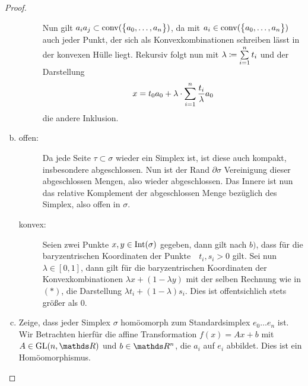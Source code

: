 \begin{Satz}
\begin{proof}
\begin{enumerate}[(a):]
\begin{description}
        Nun gilt $a_ia_j \subset \conv( \sset{a_0,\ldots , a_n} )$, da
        mit $a_i \in \ch$ auch jeder Punkt, der sich als
        Konvexkombinationen schreiben lässt in der konvexen Hülle
        liegt. Rekursiv folgt nun mit
        $\lambda \coloneqq \sp{1}{n} t_i$ und der Darstellung
        \begin{gather*}
          x = t_0 a_0 + \lambda \cdot \sp{1}{n} \frac{t_i}{\lambda}
          a_0
        \end{gather*}
      die andere Inklusion.
     \end{description}

   \item \begin{description}
     \item[offen:] Da jede Seite $\tau \subset \sigma$ wieder ein
       Simplex ist, ist diese auch kompakt, insbesondere
       abgeschlossen. Nun ist der Rand $\partial\sigma$ Vereinigung
       dieser abgeschlossen Mengen, also wieder abgeschlossen. Das
       Innere ist nun das relative Komplement der abgeschlossen Menge
       bezüglich des Simplex, also offen in $\sigma$.

     \item[konvex:] Seien zwei Punkte $x,y \in \Int(\sigma)$ gegeben,
       dann gilt nach $b)$, dass für die baryzentrischen Koordinaten
       der Punkte~~$t_i,s_i >0$ gilt. Sei nun $\lambda \in [0,1]$,
       dann gilt für die baryzentrischen Koordinaten der
       Konvexkombinationen $\lambda x + (1-\lambda y)$ mit der selben
       Rechnung wie in $(*)$, die Darstellung
       $\lambda t_i + (1-\lambda)s_i$. Dies ist offentsichlich stets
       größer als $0$.
        \end{description}

      \item Zeige, dass jeder Simplex $\sigma$ homöomorph zum
        Standardsimplex $e_0\ldots e_n$ ist. Wir Betrachten hierfür
        die affine Transformation $f(x) = Ax+b$ mit $A \in \GL(n,\R)$
        und $b \in \R^n$, die $a_i$ auf $e_i$ abbildet.  Dies ist ein
        Homöomorphismus.



\end{enumerate}
\end{proof}
\end{Satz}
